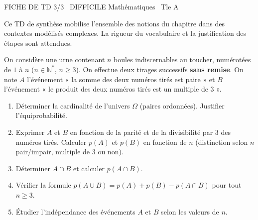 \documentclass[11pt]{article}
\begin{document}
\begin{tcolorbox}[enhanced,colback=popink,colframe=popink,arc=10pt,boxrule=0pt,left=12pt,right=12pt,top=9pt,bottom=9pt]
{\color{white}\popxbold\small FICHE DE TD 3/3 \textbullet\ DIFFICILE \hfill Mathématiques \textbullet\ Tle A\par}
\end{tcolorbox}
\vspace{4pt}
Ce TD de synthèse mobilise l'ensemble des notions du chapitre dans des contextes modélisés complexes. La rigueur du vocabulaire et la justification des étapes sont attendues.

\begin{exercice}
On considère une urne contenant $n$ boules indiscernables au toucher, numérotées de $1$ à $n$ ($n \in \mathbb{N}^*$, $n \ge 3$). On effectue deux tirages successifs \textbf{sans remise}. On note $A$ l'événement « la somme des deux numéros tirés est paire » et $B$ l'événement « le produit des deux numéros tirés est un multiple de $3$ ».
\begin{enumerate}
    \item Déterminer la cardinalité de l'univers $\Omega$ (paires ordonnées). Justifier l'équiprobabilité.
    \item Exprimer $A$ et $B$ en fonction de la parité et de la divisibilité par $3$ des numéros tirés. Calculer $p(A)$ et $p(B)$ en fonction de $n$ (distinction selon $n$ pair/impair, multiple de $3$ ou non).
    \item Déterminer $A \cap B$ et calculer $p(A \cap B)$.
    \item Vérifier la formule $p(A \cup B) = p(A) + p(B) - p(A \cap B)$ pour tout $n \ge 3$.
    \item Étudier l'indépendance des événements $A$ et $B$ selon les valeurs de $n$.
\end{enumerate}
\end{exercice}
\end{document}
